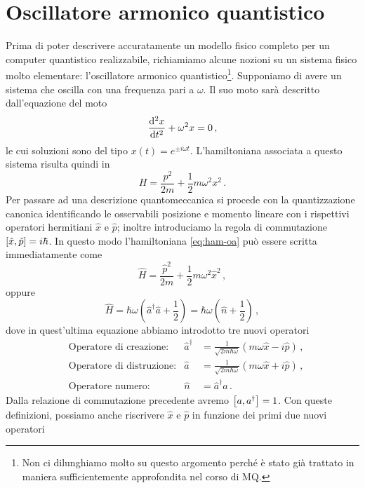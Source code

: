 \section{Oscillatore armonico quantistico}
Prima di poter descrivere accuratamente un modello fisico completo per un computer quantistico realizzabile, richiamiamo alcune nozioni su un sistema fisico molto elementare: l'oscillatore armonico quantistico\footnote{Non ci dilunghiamo molto su questo argomento perché è stato già trattato in maniera sufficientemente approfondita nel corso di MQ.}.
\noindent Supponiamo di avere un sistema che oscilla con una frequenza pari a $\omega$. Il suo moto sarà descritto dall'equazione del moto 
\begin{equation}\label{EOM_HO}
    \dv[2]{x}{t} + \omega^2 x = 0 \, ,
\end{equation}
le cui soluzioni sono del tipo $x(t) = e^{\pm i \omega t}$. L'hamiltoniana associata a questo sistema risulta quindi in
\begin{equation}\label{eq:ham-oa}
    H = \frac{p^2}{2m}+ \frac 12 m \omega^2 x^2 \, .
\end{equation}
Per passare ad una descrizione quantomeccanica si procede  con la quantizzazione canonica identificando le osservabili posizione e momento lineare con i rispettivi operatori hermitiani $\hat x$ e $\hat p$; inoltre introduciamo la regola di commutazione $\comm{\hat x}{\hat p}=i\hbar$. In questo modo l'hamiltoniana \eqref{eq:ham-oa} può essere scritta immediatamente come
\begin{equation*}
    \hat H = \frac{\hat p ^2}{2m} + \frac 12 m\omega^2 \hat x^2 \, ,
\end{equation*}
oppure
\begin{equation}\label{eq:ham-oa2}
    \hat H = \hbar \omega\left(\hat a^\dagger \hat a+\frac 12\right)=\hbar \omega\left(\hat n +\frac 12\right) \, ,
\end{equation}
dove in quest'ultima equazione abbiamo introdotto tre nuovi operatori
\begin{align*}
    &\text{Operatore di creazione:} &\hat a^\dagger &= \frac{1}{\sqrt{2m\hbar \omega}}(m\omega \hat x - i\hat p) \, , \\
    &\text{Operatore di distruzione:} &\hat a &= \frac{1}{\sqrt{2m\hbar \omega}}(m\omega \hat x + i\hat p) \, , \\
    &\text{Operatore numero:} &\hat n &= \hat a^\dagger \hat a \, .
\end{align*}
Dalla relazione di commutazione precedente avremo $\comm{a}{a^\dagger}=1$. Con queste definizioni, possiamo anche riscrivere $\hat x$ e $\hat p$ in funzione dei primi due nuovi operatori

